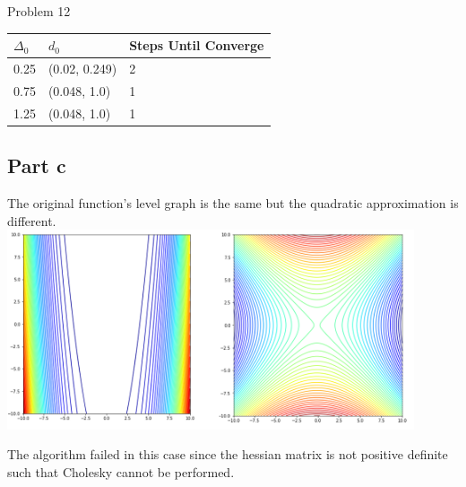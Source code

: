 \documentclass[10pt]{article}
\begin{document}
\begin{section}{Problem 12}
\begin{tabular}{lll}
	\hline
	$\Delta_0$ & $d_0$ & Steps Until Converge \\
	\hline\hline
	0.25 & (0.02, 0.249) & 2 \\
	0.75 & (0.048, 1.0)  & 1 \\
	1.25 & (0.048, 1.0)  & 1
\end{tabular}

\subsection{Part c}
The original function's level graph is the same but the quadratic approximation is different. \\
\includegraphics[width=12cm]{img/problem12_plt2.png}

The algorithm failed in this case since the hessian matrix is not positive definite such that Cholesky cannot be performed. 
\end{section}
\end{document}
